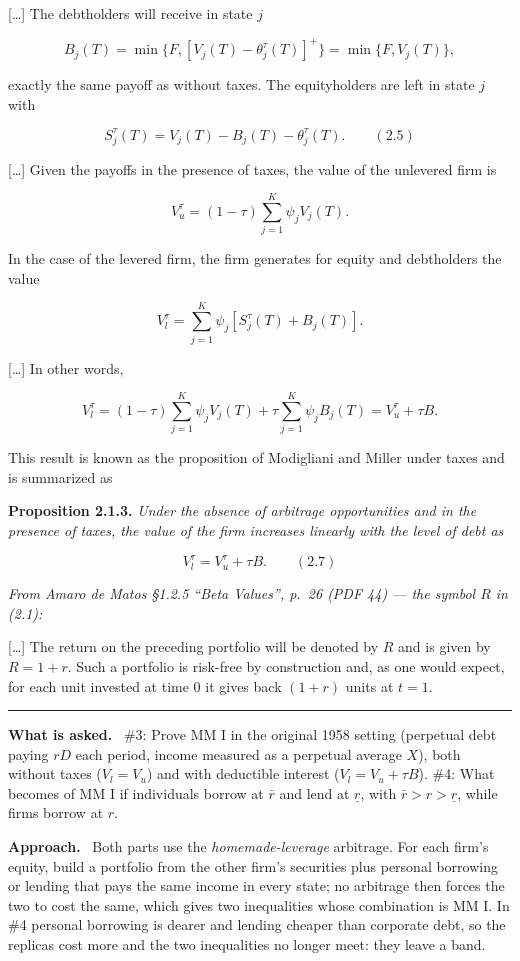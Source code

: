 \documentclass[11pt,a4paper]{article}
\numberwithin{equation}{section}
\newcommand{\asked}{\par\medskip\noindent\textbf{What is asked.}~}
\newcommand{\approach}{\par\smallskip\noindent\textbf{Approach.}~}
\newcommand{\stmtend}{\par\endgroup\nopagebreak\noindent\rule{\linewidth}{0.4pt}\par\medskip}
\begin{document}
{[}\ldots{]} The debtholders will receive in state \(j\)

\[B_j(T) = \min\{F, [V_j(T) - \theta_j^\tau(T)]^+\} = \min\{F, V_j(T)\},\]

exactly the same payoff as without taxes. The equityholders are left in state \(j\) with

\[S_j^\tau(T) = V_j(T) - B_j(T) - \theta_j^\tau(T). \qquad (2.5)\]

{[}\ldots{]} Given the payoffs in the presence of taxes, the value of the unlevered firm is

\[V_u^\tau = (1 - \tau)\sum_{j=1}^{K} \psi_j V_j(T).\]

In the case of the levered firm, the firm generates for equity and debtholders the value

\[V_l^\tau = \sum_{j=1}^{K} \psi_j [S_j^\tau(T) + B_j(T)].\]

{[}\ldots{]} In other words,

\[V_l^\tau = (1 - \tau)\sum_{j=1}^{K} \psi_j V_j(T) + \tau \sum_{j=1}^{K} \psi_j B_j(T) = V_u^\tau + \tau B.\]

This result is known as the proposition of Modigliani and Miller under taxes and is summarized as

\textbf{Proposition 2.1.3.} \emph{Under the absence of arbitrage opportunities and in the presence
of taxes, the value of the firm increases linearly with the level of debt as}

\[V_l^\tau = V_u^\tau + \tau B. \qquad (2.7)\]

\emph{From Amaro de Matos §1.2.5 ``Beta Values'', p.~26 (PDF 44) --- the symbol \(R\) in (2.1):}

{[}\ldots{]} The return on the preceding portfolio will be denoted by \(R\) and is given by
\(R = 1 + r\). Such a portfolio is risk-free by construction and, as one would expect, for each unit
invested at time 0 it gives back \((1 + r)\) units at \(t = 1\).
\stmtend

\asked
\#3: Prove MM I in the original 1958 setting (perpetual debt paying $rD$ each period, income
measured as a perpetual average $X$), both without taxes ($V_l=V_u$) and with deductible
interest ($V_l=V_u+\tau B$).
\#4: What becomes of MM I if individuals borrow at $\bar r$ and lend at $\underline r$, with
$\bar r>r>\underline r$, while firms borrow at $r$.

\approach
Both parts use the \emph{homemade-leverage} arbitrage. For each firm's equity, build a
portfolio from the other firm's securities plus personal borrowing or lending that pays the same
income in every state; no arbitrage then forces the two to cost the same, which gives two
inequalities whose combination is MM I. In \#4 personal borrowing is dearer and lending cheaper
than corporate debt, so the replicas cost more and the two inequalities no longer meet: they
leave a band.
\end{document}
